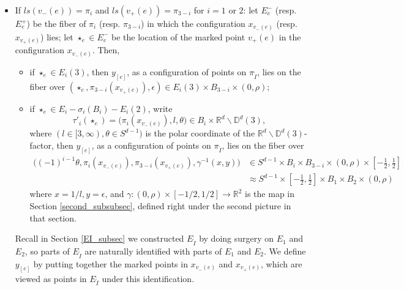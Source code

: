 \documentclass[11pt]{article}
\theoremstyle{definition}
\theoremstyle{remark}
\def\R{\mathbb{R}}
\def\D{\mathbb{D}}
\def\rI{{\mathring{I}}}
\def\tn#1{\textnormal{#1}}
\begin{document}
\begin{itemize}
let $E_e$ be the fiber of $ls(v_+(e))$ in which the configuration $x_{v_+(e)}$ lies; then, 
$y_{[e]}$ is obtained from $x_{v_+(e)}$ by adding the marked points in $cld(v_-(e))\sqcup lp(v_-(e))$ to $E_e$, as the image of $x'_{v_-(e)}$ under the map
\begin{align*}
(\R^d\backslash\D^d_{\star_e}(r^{\max}(x;e)))^{cld(v_-(e))\sqcup lp(v_-(e))}&\longrightarrow(E_e)^{cld(v_-(e))\sqcup lp(v_-(e))},\\
(w_v\in\R^d)_{v\in cld(v_-(e))\sqcup lp(v_-(e))}&\to (\tau|_{E_e})^{-1}\big(1/\epsilon\cdot(w_v+\star_e)\big)_{v\in cld(v_-(e))\sqcup lp(v_-(e))}
\end{align*}
where 
$$\tau=\begin{cases}
\tau'_i, \tn{ if }ls(v_+(e))=\pi_i, i=1 \tn{ or } 2, \tn{ and } ls(>v_+(e))=\emptyset \\
\hat\tau'_i, \tn{ if }ls(v_+(e))=\pi_i, i=1 \tn{ or } 2, \tn{ and } ls(>v_+(e))=\{\pi_{3-i}\} \\
\tau_\rI, \tn{ if }ls(v_+(e))=\pi_\rI. 
\end{cases}$$
\item  If $ls(v_-(e))=\pi_{i}$ and $ls(v_+(e))=\pi_{3-i}$ for  $i=1$ or $2$:  
let $E^-_e$ (resp. $E^+_e$) be the fiber of $\pi_{i}$ (resp. $\pi_{3-i}$) in which the configuration $x_{v_-(e)}$ (resp. $x_{v_+(e)}$) lies; 
let $\star_e\in E_e^-$ be the location of the marked point $v_+(e)$ in the configuration $x_{v_-(e)}$. 
Then, 
\begin{itemize}
\item if $\star_e\in E_{i}(3)$, 
then $y_{[e]}$, as a configuration of points on $\pi_\rI$, lies on the fiber over
$(\star_e,\pi_{3-i}(x_{v_+(e)}),\epsilon)\in E_i(3)\times B_{3-i}\times(0,\rho)$; 
\item if $\star_e\in E_{i}-\sigma_{i}(B_i)-E_{i}(2)$,  
write 
$$\tau'_i(\star_e)=\big(\pi_i(x_{v_-(e)}),l,\theta\big)\in B_i\times \R^d\backslash\D^d(3),$$
where $(l\in[3,\infty), \theta\in S^{d-1})$ is the polar coordinate of the $\R^d\backslash\D^d(3)$-factor,
then $y_{[e]}$, as a configuration of points on $\pi_\rI$, lies on the fiber over
\begin{align*}
\big((-1)^{i-1}\theta,\pi_i(x_{v_-(e)}),\pi_{3-i}(x_{v_+(e)}),\gamma^{-1}(x,y)\big)&\in S^{d-1}\times B_i\times B_{3-i}\times(0,\rho)\times[-\frac{1}{2},\frac{1}{2}]\\
&%
{\approx} S^{d-1}\times[-\frac{1}{2},\frac{1}{2}]\times B_1\times B_{2}\times(0,\rho)
\end{align*}
where $x=1/l, y=\epsilon$, and
$\gamma:(0,\rho)\times[-1/2,1/2]\to\R^2$ is the map in Section \ref{second_subsubsec}, defined right under the second picture in that section. 
\end{itemize}
Recall in Section \ref{EI_subsec} we constructed $E_\rI$ by doing surgery on $E_1$ and $E_2$, so parts of $E_\rI$ are naturally identified with parts of $E_1$ and $E_2$.
We define $y_{[e]}$ by putting together the marked points in $x_{v_-(e)}$ and $x_{v_+(e)}$, which are viewed as points in $E_\rI$ under this identification. 
\end{itemize}
\end{document}
